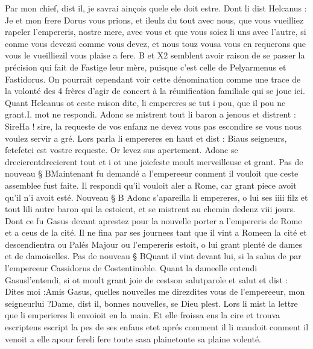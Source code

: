 \documentclass{article}
\begin{document}
\begin{pages}
      Par mon chief, dist il, je savrai ainçois quele ele doit estre.
   Dont li dist Helcanus :
   Je et mon frere Dorus vous prions, 
      et ileulz du tout avec nous, que vous vueilliez rapeler 
      l’empereris, nostre mere, 
      avec vous et que vous 
      soiez li uns avec l’autre, si conme vous 
      devezsi comme vous devez, 
      et nous touz vousa vous en requerons que 
      vous le vueilliezil vous plaise a fere.
   B et X2 semblent avoir raison de se passer la précision qui fait de Fastige leur mère, puisque c'est 
   celle de Pelyarmenus et Fastidorus. On pourrait cependant voir cette dénomination comme une trace de la volonté des 4 frères d'agir
   de concert à la réunification familiale qui se joue ici.
   Quant Helcanus ot ceste raison dite, li empereres 
   se tut i pou, que il pou ne grant.I. mot 
      ne respondi. Adonc se mistrent tout li baron a jenous et distrent :
   SireHa ! sire, la requeste de vos enfanz 
      ne devez vous pas escondire se vous nous voulez servir a gré.
   Lors parla li empereres en haut et dist :
   Biaus seigneurs, 
      fetefetei est vostre 
      requeste. Or levez sus apertement.
   Adonc se drecierentdrecierent tout et i ot une 
   joiefeste moult merveilleuse 
   et grant. \pend
\pstart Pas de nouveau § BMaintenant fu demandé a 
   l’empereeur conment il vouloit que ceste assemblee fust 
      faite. Il respondi qu’il vouloit aler a Rome, 
   car grant piece avoit qu’il n’i avoit esté. Nouveau § B
   Adonc s’apareilla li empereres, o lui ses iiii filz et 
   tout lili autre baron qui la estoient, et se mistrent au chemin dedenz 
   viii jours. Dont ce fu Gasus 
   devant aprestez pour la nouvelle porter a l’empereris de Rome 
   et a ceus de la cité. Il ne fina par ses journees tant que il vint 
   a Romeen la cité et 
   descendientra ou Palés Majour ou 
   l’empereris estoit, o lui grant plenté de dames et de damoiselles. \pend
\pstart Pas de nouveau § BQuant il vint devant lui, si la salua de par 
   l’empereeur Cassidorus de Costentinoble. 
   Quant la dameelle 
   entendi Gasusl'entendi, 
   si ot moult grant joie de cestson 
   salutparole et salut et dist : 
   Dites moi :Amis Gasus, quelles nouvelles 
      me direzdites vous de 
      l’empereeur, mon seigneurlui ?Dame, dist il, bonnes nouvelles, se Dieu plest.
   Lors li mist la lettre que li emperieres 
   li envoioit en la main. 
   Et elle froissa ens la cire et trouva 
   escriptens escript la pes de ses enfans 
   etet aprés comment il li mandoit conment il venoit a elle 
   apour fereli fere 
   toute sasa plainetoute sa plaine volenté. 

\end{pages}
\end{document}
